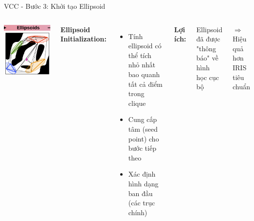 \documentclass[aspectratio=169]{beamer}
\begin{document}
\begin{frame}{VCC - Bước 3: Khởi tạo Ellipsoid}
    \begin{columns}[c]
        \centering
        \includegraphics[width=\textwidth]{../imgs/VCC-3.png}

        \textbf{Ellipsoid Initialization:}
        \begin{itemize}
            \item Tính ellipsoid có thể tích nhỏ nhất bao quanh tất cả điểm trong clique
            \item Cung cấp tâm (seed point) cho bước tiếp theo
            \item Xác định hình dạng ban đầu (các trục chính)
        \end{itemize}

        \vspace{0.5em}
        \textbf{Lợi ích:}
        
        Ellipsoid đã được "thông báo" về hình học cục bộ
        
        $\Rightarrow$ Hiệu quả hơn IRIS tiêu chuẩn
    \end{columns}
\end{frame}
\end{document}
